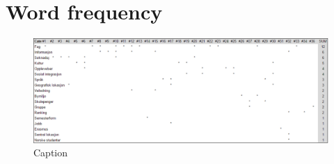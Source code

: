 \chapter{Word frequency}
\begin{figure}[H]
    \centering
    \includegraphics[width=1.0\textwidth]{fig/word_freq.png}
    \caption{Caption}
    \label{fig:my_label}
\end{figure}{}
